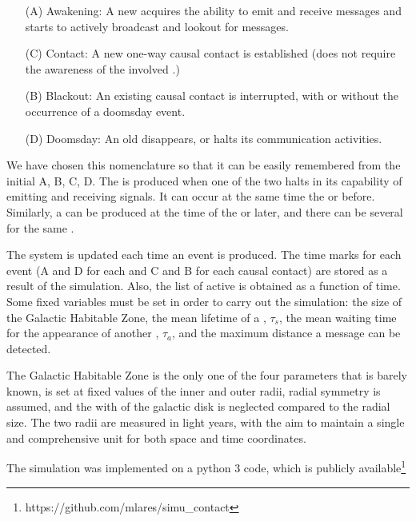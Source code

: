 \begin{enumerate}
   \item[(A)] Awakening: A new \ceti{} acquires the ability to emit
      and receive messages and starts to actively broadcast and
      lookout for messages.
   \item[(C)] Contact: A new one-way causal contact is established
      (does not require the awareness of the involved \cetis{}.)
   \item[(B)] Blackout: An existing causal contact is interrupted,
      with or without the occurrence of a doomsday event.
   \item[(D)] Doomsday: An old \ceti{} disappears, or halts its
      communication activities.
\end{enumerate}

We have chosen this nomenclature so that it can be easily remembered
from the initial A, B, C, D.
%
The \blackout is produced when one of the two \cetis{} halts in its
capability of emitting and receiving signals.
%
It can occur at the same time the \doomsday or before.
%
Similarly, a \ccontact can be produced at the time of the \aawakening
or later, and there can be several \contacts for the same \ceti{}.

                        

The system is updated each time an event is produced.
%
The time marks for each event (A and D for each \ceti{} and C and B for
each causal contact) are stored as a result of the simulation.
%
Also, the list of active \cetis{} is obtained as a function of time.
%
Some fixed variables must be set in order to carry out the simulation:
the size of the Galactic Habitable Zone, the mean lifetime of a
\ceti{},
$\tau_s$, the mean waiting time for the appearance of another \ceti{},
$\tau_a$, and the maximum distance a message can be detected.



The Galactic Habitable Zone is the only one of the four parameters
that is barely known, is set at fixed values of the inner and outer
radii, radial symmetry is assumed, and the with of the galactic disk is
neglected compared to the radial size.
%
The two radii are measured in light years, with the aim to maintain a
single and comprehensive unit for both space and time coordinates. 

The simulation was implemented on a python 3 code, which is publicly
available\footnote{https://github.com/mlares/simu\_contact}

